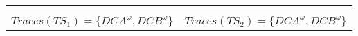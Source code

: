 \begin{tabular}{cc}
    \begin{minipage}{.4\textwidth}
      
      \caption*{$TS_1$}
    \end{minipage}
    & 
    \begin{minipage}{.4\textwidth}
      
      \caption*{$TS_2$}
    \end{minipage} 
    \\
    &
    \\
    $Traces(TS_1) = \{ DCA^{\omega}, DCB^{\omega} \}$
    &
    $Traces(TS_2) = \{ DCA^{\omega}, DCB^{\omega} \}$
\end{tabular}